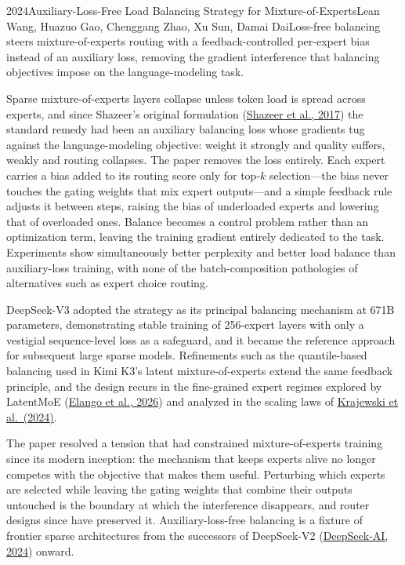 
\begin{papersummary}{2024}{Auxiliary-Loss-Free Load Balancing Strategy for Mixture-of-Experts}{Lean Wang, Huazuo Gao, Chenggang Zhao, Xu Sun, Damai Dai}{Loss-free balancing steers mixture-of-experts routing with a feedback-controlled per-expert bias instead of an auxiliary loss, removing the gradient interference that balancing objectives impose on the language-modeling task.}

Sparse mixture-of-experts layers collapse unless token load is spread across experts, and since Shazeer's original formulation (\hyperref[paper:shazeer-2017-moe]{Shazeer et al., 2017}) the standard remedy had been an auxiliary balancing loss whose gradients tug against the language-modeling objective: weight it strongly and quality suffers, weakly and routing collapses. The paper removes the loss entirely. Each expert carries a bias added to its routing score only for top-$k$ selection---the bias never touches the gating weights that mix expert outputs---and a simple feedback rule adjusts it between steps, raising the bias of underloaded experts and lowering that of overloaded ones. Balance becomes a control problem rather than an optimization term, leaving the training gradient entirely dedicated to the task. Experiments show simultaneously better perplexity and better load balance than auxiliary-loss training, with none of the batch-composition pathologies of alternatives such as expert choice routing.

DeepSeek-V3 adopted the strategy as its principal balancing mechanism at 671B parameters, demonstrating stable training of 256-expert layers with only a vestigial sequence-level loss as a safeguard, and it became the reference approach for subsequent large sparse models. Refinements such as the quantile-based balancing used in Kimi K3's latent mixture-of-experts extend the same feedback principle, and the design recurs in the fine-grained expert regimes explored by LatentMoE (\hyperref[paper:elango-2026-latentmoe]{Elango et al., 2026}) and analyzed in the scaling laws of \hyperref[paper:krajewski-2024]{Krajewski et al.\ (2024)}.

The paper resolved a tension that had constrained mixture-of-experts training since its modern inception: the mechanism that keeps experts alive no longer competes with the objective that makes them useful. Perturbing which experts are selected while leaving the gating weights that combine their outputs untouched is the boundary at which the interference disappears, and router designs since have preserved it. Auxiliary-loss-free balancing is a fixture of frontier sparse architectures from the successors of DeepSeek-V2 (\hyperref[paper:deepseek-2024-v2]{DeepSeek-AI, 2024}) onward.

\end{papersummary}
